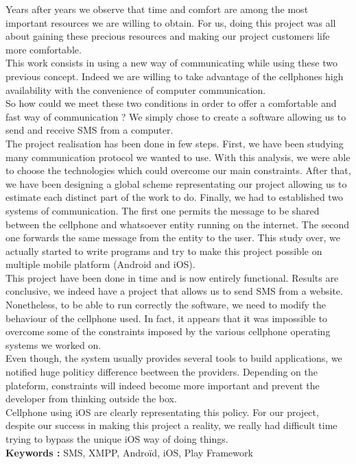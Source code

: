 \newpage



Years after years we observe that time and comfort are among the most important resources
we are willing to obtain. For us, doing this project was all about gaining these precious
resources and making our project customers life more comfortable.
\\
This work consists in using a new way of communicating while using these two previous concept. 
Indeed we are willing to take advantage of the cellphones high availability with the convenience 
of computer communication.
\\
So how could we meet these two conditions in order to offer a comfortable and fast way of communication ?
We simply chose to create a software allowing us to send and receive SMS from a computer.
\\
The project realisation has been done in few steps. First, we have been studying many communication protocol
we wanted to use. With this analysis, we were able to choose the technologies which could overcome our main constraints.
After that, we have been designing a global scheme representating our project allowing us to estimate
each distinct part of the work to  do. Finally, we had to established two systems of communication.
The first one permits the message to be shared between the cellphone and whatsoever entity running
on the internet. The second one forwards the same message from the entity to the user. This study
over, we actually started to write programs and try to make this project possible on multiple
mobile platform (Android and iOS).
\\
This project have been done in time and is now entirely functional. Results are conclusive,
we indeed have a project that allows us to send SMS from a website. Nonetheless, to be able 
to run correctly the software, we need to modify the behaviour of the cellphone used. In fact,
it appears that it was impossible to overcome some of the constraints imposed by the various
cellphone operating systems we worked on. 
\\
Even though, the system usually provides several tools to build applications, we notified huge
politicy difference beetween the providers. Depending on the plateform, constraints will indeed
become more important and prevent the developer from thinking outside the box.
\\
Cellphone using iOS are clearly representating this policy. For our project, despite our success in
making this project a reality, we really had difficult time trying to bypass the unique iOS way of doing things.
\\



\textbf{Keywords : }
SMS, XMPP, Androïd, iOS, Play Framework
